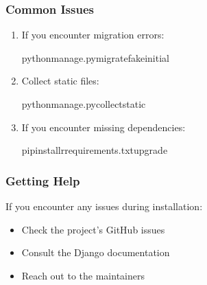 \documentclass[letterpaper,10pt,english]{sphinxmanual}
\begin{document}
\subsubsection{Common Issues}
\label{\detokenize{installation:common-issues}}\begin{enumerate}
%
\item {} 
\sphinxAtStartPar
{}

\sphinxAtStartPar
If you encounter migration errors:

\begin{sphinxVerbatim}[commandchars=\\\{\}]
pythonmanage.pymigrate\PYGZhy{}\PYGZhy{}fake\PYGZhy{}initial
\end{sphinxVerbatim}

\item {} 
\sphinxAtStartPar
{}

\sphinxAtStartPar
Collect static files:

\begin{sphinxVerbatim}[commandchars=\\\{\}]
pythonmanage.pycollectstatic
\end{sphinxVerbatim}

\item {} 
\sphinxAtStartPar
{}

\sphinxAtStartPar
If you encounter missing dependencies:

\begin{sphinxVerbatim}[commandchars=\\\{\}]
pipinstall\PYGZhy{}rrequirements.txt\PYGZhy{}\PYGZhy{}upgrade
\end{sphinxVerbatim}

\end{enumerate}


\subsubsection{Getting Help}
\label{\detokenize{installation:getting-help}}
\sphinxAtStartPar
If you encounter any issues during installation:
\begin{itemize}
\item {} 
\sphinxAtStartPar
Check the project’s GitHub issues

\item {} 
\sphinxAtStartPar
Consult the Django documentation

\item {} 
\sphinxAtStartPar
Reach out to the maintainers

\end{itemize}
\end{document}
